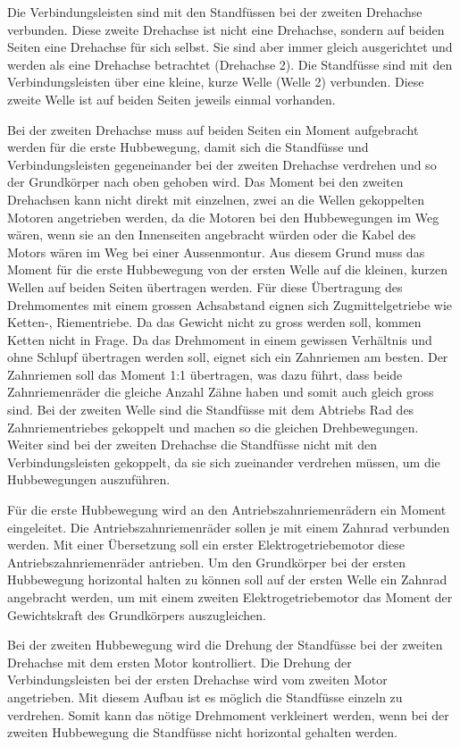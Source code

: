 Die Verbindungsleisten sind mit den Standfüssen bei der zweiten Drehachse verbunden. Diese zweite Drehachse ist nicht eine Drehachse, sondern auf beiden Seiten eine Drehachse für sich selbst. Sie sind aber immer gleich ausgerichtet und werden als eine Drehachse betrachtet (Drehachse 2). Die Standfüsse sind mit den Verbindungsleisten über eine kleine, kurze Welle (Welle 2) verbunden. Diese zweite Welle ist auf beiden Seiten jeweils einmal vorhanden. 

Bei der zweiten Drehachse muss auf beiden Seiten ein Moment aufgebracht werden für die erste Hubbewegung, damit sich die Standfüsse und Verbindungsleisten gegeneinander bei der zweiten Drehachse verdrehen und so der Grundkörper nach oben gehoben wird. Das Moment bei den zweiten Drehachsen kann nicht direkt mit einzelnen, zwei an die Wellen gekoppelten Motoren angetrieben werden, da die Motoren bei den Hubbewegungen im Weg wären, wenn sie an den Innenseiten angebracht würden oder die Kabel des Motors wären im Weg bei einer Aussenmontur. Aus diesem Grund muss das Moment für die erste Hubbewegung von der ersten Welle auf die kleinen, kurzen Wellen auf beiden Seiten übertragen werden. Für diese Übertragung des Drehmomentes mit einem grossen Achsabstand eignen sich Zugmittelgetriebe wie Ketten-, Riementriebe. Da das Gewicht nicht zu gross werden soll, kommen Ketten nicht in Frage. Da das Drehmoment in einem gewissen Verhältnis und ohne Schlupf übertragen werden soll, eignet sich ein Zahnriemen am besten. Der Zahnriemen soll das Moment 1:1 übertragen, was dazu führt, dass beide Zahnriemenräder die gleiche Anzahl Zähne haben und somit auch gleich gross sind. Bei der zweiten Welle sind die Standfüsse mit dem Abtriebs Rad des Zahnriementriebes gekoppelt und machen so die gleichen Drehbewegungen. Weiter sind bei der zweiten Drehachse die Standfüsse nicht mit den Verbindungsleisten gekoppelt, da sie sich zueinander verdrehen müssen, um die Hubbewegungen auszuführen. 

Für die erste Hubbewegung wird an den Antriebszahnriemenrädern ein Moment eingeleitet. Die Antriebszahnriemenräder sollen je mit einem Zahnrad verbunden werden. Mit einer Übersetzung soll ein erster Elektrogetriebemotor diese Antriebszahnriemenräder antrieben. Um den Grundkörper bei der ersten Hubbewegung horizontal halten zu können soll auf der ersten Welle ein Zahnrad angebracht werden, um mit einem zweiten Elektrogetriebemotor das Moment der Gewichtskraft des Grundkörpers auszugleichen.

Bei der zweiten Hubbewegung wird die Drehung der Standfüsse bei der zweiten Drehachse mit dem ersten Motor kontrolliert. Die Drehung der Verbindungsleisten bei der ersten Drehachse wird vom zweiten Motor angetrieben. Mit diesem Aufbau ist es möglich die Standfüsse einzeln zu verdrehen. Somit kann das nötige Drehmoment verkleinert werden, wenn bei der zweiten Hubbewegung die Standfüsse nicht horizontal gehalten werden.

